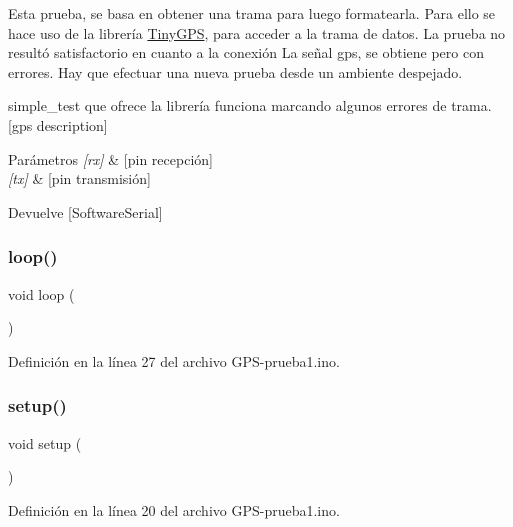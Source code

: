 Esta prueba, se basa en obtener una trama para luego formatearla. Para ello se hace uso de la librería \hyperlink{class_tiny_g_p_s}{Tiny\+G\+PS}, para acceder a la trama de datos. La prueba no resultó satisfactorio en cuanto a la conexión La señal gps, se obtiene pero con errores. Hay que efectuar una nueva prueba desde un ambiente despejado.

simple\+\_\+test que ofrece la librería funciona marcando algunos errores de trama. \mbox{[}gps description\mbox{]} 
\begin{DoxyParams}{Parámetros}
{\em \mbox{[}rx\mbox{]}} & \mbox{[}pin recepción\mbox{]} \\
\hline
{\em \mbox{[}tx\mbox{]}} & \mbox{[}pin transmisión\mbox{]} \\
\hline
\end{DoxyParams}
\begin{DoxyReturn}{Devuelve}
\mbox{[}Software\+Serial\mbox{]} 
\end{DoxyReturn}
\mbox{\label{_g_p_s-prueba1_8ino_afe461d27b9c48d5921c00d521181f12f}} 
\subsubsection{\texorpdfstring{loop()}{loop()}}
{\footnotesize\ttfamily void loop (\begin{DoxyParamCaption}{ }\end{DoxyParamCaption})}



Definición en la línea 27 del archivo G\+P\+S-\/prueba1.\+ino.

\mbox{\label{_g_p_s-prueba1_8ino_a4fc01d736fe50cf5b977f755b675f11d}} 
\subsubsection{\texorpdfstring{setup()}{setup()}}
{\footnotesize\ttfamily void setup (\begin{DoxyParamCaption}{ }\end{DoxyParamCaption})}



Definición en la línea 20 del archivo G\+P\+S-\/prueba1.\+ino.



